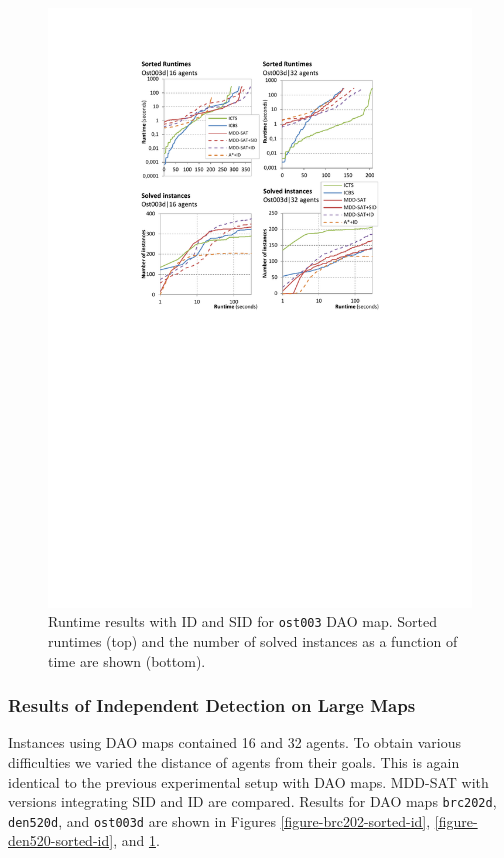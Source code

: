 \documentclass[jair,oneside,11pt]{article}
\begin{document}
\begin{figure}[h]
\centering
\includegraphics[trim={2.5cm 14.5cm 2.5cm 2.6cm},clip,width=1.0\textwidth]{expr-id_ost003_sorted.pdf}
\vspace{-0.6cm}\caption{Runtime results with ID and SID for \texttt{ost003} DAO map. Sorted runtimes (top) and the number of solved instances as a function of time are shown (bottom).}
\label{figure-ost003-sorted-id}
\end{figure}

\subsubsection{Results of Independent Detection on Large Maps}

Instances using DAO maps contained 16 and 32 agents. To obtain various difficulties we varied the distance of agents from their goals. This is again identical to the previous experimental setup with DAO maps. MDD-SAT with versions integrating SID and ID are compared. Results for DAO maps \texttt{brc202d}, \texttt{den520d}, and \texttt{ost003d} are shown in Figures \ref{figure-brc202-sorted-id}, \ref{figure-den520-sorted-id}, and \ref{figure-ost003-sorted-id}.
\end{document}
